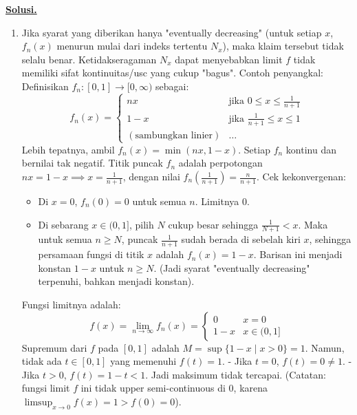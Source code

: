\documentclass[12pt,twoside]{article}
\newenvironment{solution}
{
	\par\noindent\textbf{\underline{Solusi.}}\\
}
{
	\par
}
\begin{document}
\begin{enumerate}
\begin{solution}
\begin{enumerate}
            \item[(2)] Jika syarat yang diberikan hanya "eventually decreasing" (untuk setiap $x$, $f_n(x)$ menurun mulai dari indeks tertentu $N_x$), maka klaim tersebut tidak selalu benar. Ketidakseragaman $N_x$ dapat menyebabkan limit $f$ tidak memiliki sifat kontinuitas/usc yang cukup "bagus".
                  Contoh penyangkal:
                  Definisikan $f_n : [0, 1] \to [0, \infty)$ sebagai:
                  \[ f_n(x) = \begin{cases} n x & \text{jika } 0 \le x \le \frac{1}{n+1} \\ 1 - x & \text{jika } \frac{1}{n+1} \le x \le 1 \\ (\text{sambungkan linier}) & \dots \end{cases} \]
                  Lebih tepatnya, ambil $f_n(x) = \min(nx, 1-x)$.
                  Setiap $f_n$ kontinu dan bernilai tak negatif.
                  Titik puncak $f_n$ adalah perpotongan $nx = 1-x \implies x = \frac{1}{n+1}$, dengan nilai $f_n(\frac{1}{n+1}) = \frac{n}{n+1}$.
                  Cek kekonvergenan:
                  \begin{itemize}
                    \item Di $x=0$, $f_n(0) = 0$ untuk semua $n$. Limitnya 0.
                    \item Di sebarang $x \in (0, 1]$, pilih $N$ cukup besar sehingga $\frac{1}{N+1} < x$.
                          Maka untuk semua $n \ge N$, puncak $\frac{1}{n+1}$ sudah berada di sebelah kiri $x$, sehingga persamaan fungsi di titik $x$ adalah $f_n(x) = 1-x$.
                          Barisan ini menjadi konstan $1-x$ untuk $n \ge N$.
                          (Jadi syarat "eventually decreasing" terpenuhi, bahkan menjadi konstan).
                  \end{itemize}
                  Fungsi limitnya adalah:
                  \[ f(x) = \lim_{n \to \infty} f_n(x) = \begin{cases} 0 & x = 0 \\ 1-x & x \in (0, 1] \end{cases} \]
                  Supremum dari $f$ pada $[0, 1]$ adalah $M = \sup \{1-x \mid x > 0\} = 1$.
                  Namun, tidak ada $t \in [0, 1]$ yang memenuhi $f(t) = 1$.
                  - Jika $t=0$, $f(t)=0 \ne 1$.
                  - Jika $t > 0$, $f(t) = 1-t < 1$.
                  Jadi maksimum tidak tercapai. (Catatan: fungsi limit $f$ ini tidak upper semi-continuous di 0, karena $\limsup_{x \to 0} f(x) = 1 > f(0)=0$).
          \end{enumerate}
        \end{solution}
\end{enumerate}
\pagebreak
\end{document}
